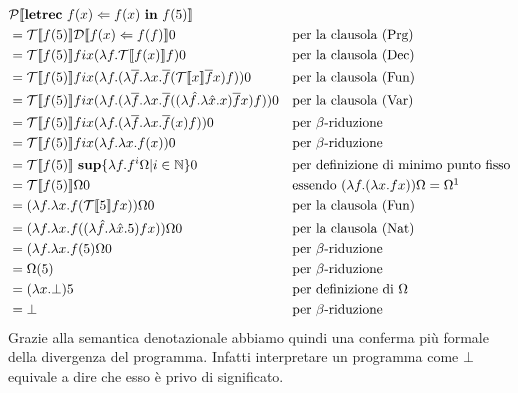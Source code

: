     \begin{align*}
        &\mathcal{P}\doublebracket{\mbox{\textbf{letrec}}\ f(x) \Leftarrow f(x)\ \mbox{\textbf{in}}\ f(5)} &&\\
        &= \mathcal{T}\doublebracket{ f(5)}\mathcal{D}\doublebracket{ f(x)\Leftarrow f(f)} 0 &&\mbox{per la clausola (Prg)}\\
        &= \mathcal{T}\doublebracket{ f(5)} fix(\lambda f.\mathcal{T}\doublebracket{ f(x)} f)0 &&\mbox{per la clausola (Dec)}\\
        &= \mathcal{T}\doublebracket{ f(5)} fix(\lambda f. (\lambda \overline{f}.\lambda x. \overline{f}(\mathcal{T}\doublebracket{ x}\overline{f}x)f))0 &&\mbox{per la clausola (Fun)}\\
        &= \mathcal{T}\doublebracket{ f(5)} fix(\lambda f. (\lambda \overline{f}.\lambda x. \overline{f}((\lambda\hat{f}.\lambda \hat{x}.x)\overline{f}x)f))0 &&\mbox{per la clausola (Var)}\\
        &= \mathcal{T}\doublebracket{ f(5)} fix(\lambda f. (\lambda \overline{f}.\lambda x. \overline{f}(x)f))0 &&\mbox{per $\beta$-riduzione}\\
        &= \mathcal{T}\doublebracket{ f(5)} fix(\lambda f.\lambda x.f(x))0 &&\mbox{per $\beta$-riduzione}\\
        &= \mathcal{T}\doublebracket{ f(5)}\ \mbox{\textbf{sup}}\{\lambda f.f^i\Omega |i\in\mathbb{N}\}0 &&\mbox{per definizione di minimo punto fisso}\\
        &= \mathcal{T}\doublebracket{ f(5)}\Omega 0 &&\mbox{essendo $(\lambda f.(\lambda x.fx))\Omega = \Omega$}\footnotemark\\
        &= (\lambda f.\lambda x. f(\mathcal{T}\doublebracket{ 5} fx))\Omega 0 &&\mbox{per la clausola (Fun)}\\
        &= (\lambda f.\lambda x. f((\lambda\hat{f}.\lambda\hat{x}.5) fx))\Omega 0 &&\mbox{per la clausola (Nat)}\\
        &= (\lambda f.\lambda x. f(5)\Omega 0 &&\mbox{per $\beta$-riduzione}\\
        &= \Omega(5) &&\mbox{per $\beta$-riduzione}\\
        &= (\lambda x.\bot)5 &&\mbox{per definizione di $\Omega$}\\
        &= \bot &&\mbox{per $\beta$-riduzione}
    \end{align*}
    Grazie alla semantica denotazionale abbiamo quindi una conferma più formale della divergenza del programma. Infatti interpretare un programma come $\bot$ equivale a dire che esso è privo di significato.
